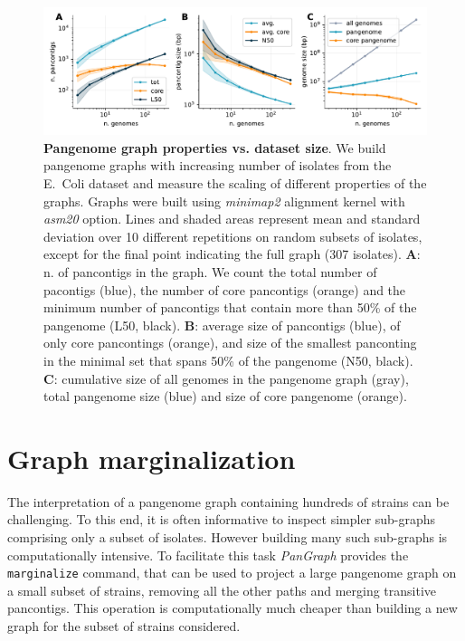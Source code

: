 \documentclass[aps,rmp,reprint,superscriptaddress,notitlepage,10pt]{revtex4-1}
\begin{document}
\begin{figure}[htb]
    \includegraphics[width=.9\textwidth]{figs/incr_size.pdf}
    \caption{{\bf Pangenome graph properties vs. dataset size}.
        We build pangenome graphs with increasing number of isolates from the E.~Coli dataset and measure the scaling of different properties of the graphs. Graphs were built using \textit{minimap2} alignment kernel with \textit{asm20} option. Lines and shaded areas represent mean and standard deviation over 10 different repetitions on random subsets of isolates, except for the final point indicating the full graph (307 isolates).
        \textbf{A}: n. of pancontigs in the graph. We count the total number of pacontigs (blue), the number of core pancontigs (orange) and the minimum number of pancontigs that contain more than 50\% of the pangenome (L50, black).
        \textbf{B}: average size of pancontigs (blue), of only core pancontings (orange), and size of the smallest panconting in the minimal set that spans 50\% of the pangenome (N50, black).
        \textbf{C}: cumulative size of all genomes in the pangenome graph (gray), total pangenome size (blue) and size of core pangenome (orange).
    }
    \label{fig:panx-size}
\end{figure}

\section{Graph marginalization}

The interpretation of a pangenome graph containing hundreds of strains can be challenging. To this end, it is often informative to inspect simpler sub-graphs comprising only a subset of isolates. However building many such sub-graphs is computationally intensive. To facilitate this task \textit{PanGraph} provides the \verb|marginalize| command, that can be used to project a large pangenome graph on a small subset of strains, removing all the other paths and merging transitive pancontigs. This operation is computationally much cheaper than building a new graph for the subset of strains considered.
\end{document}
